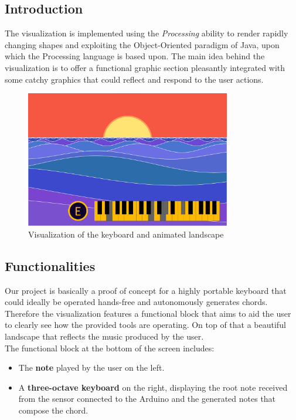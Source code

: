 \documentclass{article}
\begin{document}
\subsection{Introduction}
The visualization is implemented using the \textit{Processing} ability to render rapidly changing shapes and exploiting the Object-Oriented paradigm of Java, upon which the Processing language is based upon. The main idea behind the visualization is to offer a functional graphic section pleasantly integrated with some catchy graphics that could reflect and respond to the user actions.

\begin{figure}[H]
\centering
\includegraphics[width=0.8\textwidth]{seaLandscape.png}
\caption{Visualization of the keyboard and animated landscape}
\label{fig:seaLandscape}
\end{figure}

\subsection{Functionalities}
Our project is basically a proof of concept for a highly portable keyboard that could ideally be operated hands-free and autonomously generates chords. Therefore the visualization features a functional block that aims to aid the user to clearly see how the provided tools are operating. On top of that a beautiful landscape that reflects the music produced by the user.\\

The functional block at the bottom of the screen includes:
\begin{itemize}
    \item The \textbf{note} played by the user on the left.
    \item A \textbf{three-octave keyboard} on the right, displaying the root note received from the sensor connected to the Arduino and the generated notes that compose the chord.
\end{itemize}
\end{document}
